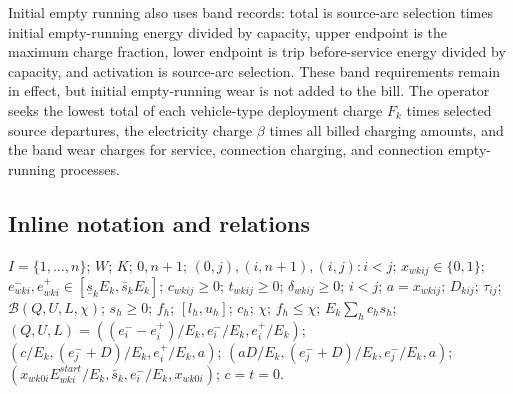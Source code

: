 \documentclass[10pt]{article}
\begin{document}
Initial empty running also uses band records: total is source-arc selection times initial empty-running energy divided by capacity, upper endpoint is the maximum charge fraction, lower endpoint is trip before-service energy divided by capacity, and activation is source-arc selection. These band requirements remain in effect, but initial empty-running wear is not added to the bill. The operator seeks the lowest total of each vehicle-type deployment charge $F_k$ times selected source departures, the electricity charge $\beta$ times all billed charging amounts, and the band wear charges for service, connection charging, and connection empty-running processes.

\subsection*{Inline notation and relations}
$I=\{1,\ldots,n\}$; $W$; $K$; $0,n+1$; $(0,j),(i,n+1),(i,j):i<j$; $x_{wkij}\in\{0,1\}$; $e^-_{wki},e^+_{wki}\in[\underline s_kE_k,\bar s_kE_k]$; $c_{wkij}\ge0$; $t_{wkij}\ge0$; $\delta_{wkij}\ge0$; $i<j$; $a=x_{wkij}$; $D_{kij}$; $\tau_{ij}$; $\mathcal B(Q,U,L,\chi)$; $s_h\ge0$; $f_h$; $[l_h,u_h]$; $c_h$; $\chi$; $f_h\le\chi$; $E_k\sum_hc_hs_h$; $(Q,U,L)=((e^-_i-e^+_i)/E_k,e^-_i/E_k,e^+_i/E_k)$; $(c/E_k,(e^-_j+D)/E_k,e^+_i/E_k,a)$; $(aD/E_k,(e^-_j+D)/E_k,e^-_j/E_k,a)$; $(x_{wk0i}E^{start}_{wki}/E_k,\bar s_k,e^-_i/E_k,x_{wk0i})$; $c=t=0$.
\end{document}
